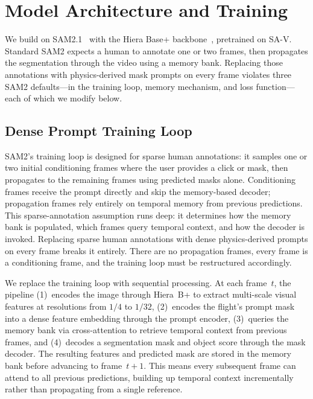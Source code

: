 \documentclass[1p,11pt]{elsarticle}
\begin{document}
\section{Model Architecture and Training}
\label{sec:architecture}

We build on SAM2.1~\cite{ravi2024sam2} with the Hiera Base+ backbone~\cite{ryali2023hiera}, pretrained on SA-V. Standard SAM2 expects a human to annotate one or two frames, then propagates the segmentation through the video using a memory bank. Replacing those annotations with physics-derived mask prompts on every frame violates three SAM2 defaults---in the training loop, memory mechanism, and loss function---each of which we modify below.

\subsection{Dense Prompt Training Loop}

SAM2's training loop is designed for sparse human annotations: it samples one or two initial conditioning frames where the user provides a click or mask, then propagates to the remaining frames using predicted masks alone. Conditioning frames receive the prompt directly and skip the memory-based decoder; propagation frames rely entirely on temporal memory from previous predictions. This sparse-annotation assumption runs deep: it determines how the memory bank is populated, which frames query temporal context, and how the decoder is invoked. Replacing sparse human annotations with dense physics-derived prompts on every frame breaks it entirely. There are no propagation frames, every frame is a conditioning frame, and the training loop must be restructured accordingly.

We replace the training loop with sequential processing. At each frame~$t$, the pipeline (1)~encodes the image through Hiera~B+ to extract multi-scale visual features at resolutions from $1/4$ to $1/32$, (2)~encodes the flight's prompt mask into a dense feature embedding through the prompt encoder, (3)~queries the memory bank via cross-attention to retrieve temporal context from previous frames, and (4)~decodes a segmentation mask and object score through the mask decoder. The resulting features and predicted mask are stored in the memory bank before advancing to frame~$t{+}1$. This means every subsequent frame can attend to all previous predictions, building up temporal context incrementally rather than propagating from a single reference.
\end{document}
